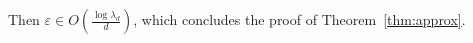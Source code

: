 \begin{subappendices}
\begin{prv*}
Then $\varepsilon\in O\left( \frac{\log\lambda_d}{d}\right)$, which concludes the proof of Theorem~\ref{thm:approx}.

\end{prv*}

\end{subappendices}
